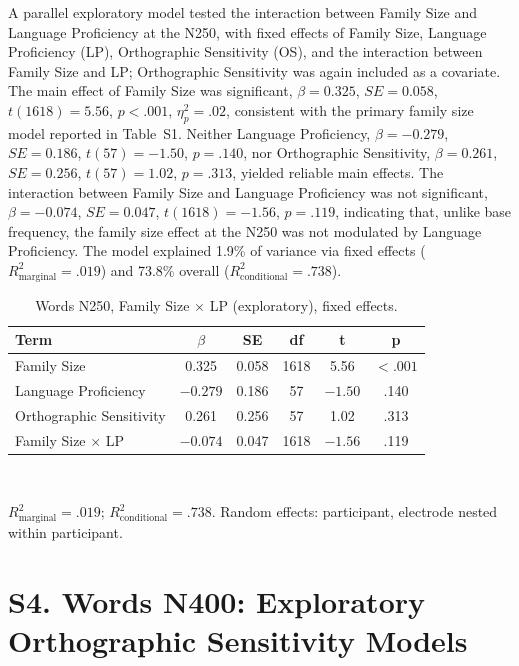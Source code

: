 \documentclass[11pt]{article}
\begin{document}
A parallel exploratory model tested the interaction between Family Size and Language Proficiency at the N250, with fixed effects of Family Size, Language Proficiency (LP), Orthographic Sensitivity (OS), and the interaction between Family Size and LP; Orthographic Sensitivity was again included as a covariate. The main effect of Family Size was significant, $\beta = 0.325$, $SE = 0.058$, $t(1618) = 5.56$, $p < .001$, $\eta^2_p = .02$, consistent with the primary family size model reported in Table~S1. Neither Language Proficiency, $\beta = -0.279$, $SE = 0.186$, $t(57) = -1.50$, $p = .140$, nor Orthographic Sensitivity, $\beta = 0.261$, $SE = 0.256$, $t(57) = 1.02$, $p = .313$, yielded reliable main effects. The interaction between Family Size and Language Proficiency was not significant, $\beta = -0.074$, $SE = 0.047$, $t(1618) = -1.56$, $p = .119$, indicating that, unlike base frequency, the family size effect at the N250 was not modulated by Language Proficiency. The model explained 1.9\% of variance via fixed effects ($R^2_{\mathrm{marginal}} = .019$) and 73.8\% overall ($R^2_{\mathrm{conditional}} = .738$).

\begin{table}[h!]
	\centering
	\small
	\caption{Words N250, Family Size $\times$ LP (exploratory), fixed effects.}
	\label{tab:s3b}
	\begin{tabular}{lccccc}
		\toprule
		\textbf{Term} & $\beta$ & \textbf{SE} & \textbf{df} & \textbf{t} & \textbf{p} \\
		\midrule
		Family Size & 0.325 & 0.058 & 1618 & 5.56 & $< .001$ \\
		Language Proficiency & $-0.279$ & 0.186 & 57 & $-1.50$ & .140 \\
		Orthographic Sensitivity & 0.261 & 0.256 & 57 & 1.02 & .313 \\
		Family Size $\times$ LP & $-0.074$ & 0.047 & 1618 & $-1.56$ & .119 \\
		\bottomrule
	\end{tabular}
	\\[4pt]
	\raggedright \footnotesize $R^2_{\mathrm{marginal}} = .019$; $R^2_{\mathrm{conditional}} = .738$. Random effects: participant, electrode nested within participant.
\end{table}

\section*{S4. Words N400: Exploratory Orthographic Sensitivity Models}
\end{document}
